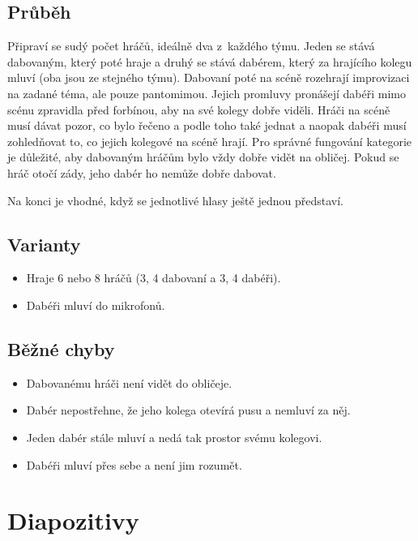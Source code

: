  
\subsection{Průběh} Připraví se sudý počet hráčů, ideálně dva z~každého týmu. Jeden se stává dabovaným, který poté hraje a druhý se stává dabérem, který za hrajícího kolegu mluví (oba jsou ze stejného týmu).  
Dabovaní poté na scéně rozehrají improvizaci na zadané téma, ale pouze pantomimou. Jejich promluvy pronášejí dabéři mimo scénu zpravidla před forbínou, aby na své kolegy dobře viděli. Hráči na scéně musí dávat pozor, co bylo řečeno a podle toho také jednat a naopak dabéři musí zohledňovat to, co jejich kolegové na scéně hrají. Pro správné fungování kategorie je důležité, aby dabovaným hráčům bylo vždy dobře vidět na obličej. Pokud se hráč otočí zády, jeho dabér ho nemůže dobře dabovat. 
 
Na konci je vhodné, když se jednotlivé hlasy ještě jednou představí. 
 
\subsection{ Varianty } \begin{itemize}
\item Hraje 6 nebo 8 hráčů (3, 4 dabovaní a 3, 4 dabéři).
\item Dabéři mluví do mikrofonů.
\end{itemize}
 
\subsection{ Běžné chyby } \begin{itemize}
\item Dabovanému hráči není vidět do obličeje.
\item Dabér nepostřehne, že jeho kolega otevírá pusu a nemluví za něj.
\item Jeden dabér stále mluví a nedá tak prostor svému kolegovi.
\item Dabéři mluví přes sebe a není jim rozumět.
\end{itemize}
 
 
 
 
 
\needspace{5cm} \section{Diapozitivy} \label{diapozitivy}  
 
